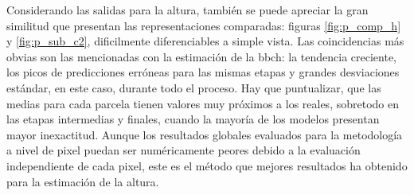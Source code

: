 \par Considerando las salidas para la altura, también se puede apreciar la gran similitud que presentan las representaciones comparadas: figuras \ref{fig:p_comp_h} y \ref{fig:p_sub_c2}, dificilmente diferenciables a simple vista. Las coincidencias más obvias son las mencionadas con la estimación de la \gls{bbch}: la tendencia creciente, los picos de predicciones erróneas para las mismas etapas y grandes desviaciones estándar, en este caso, durante todo el proceso. Hay que puntualizar, que las medias para cada parcela tienen valores muy próximos a los reales, sobretodo en las etapas intermedias y finales, cuando la mayoría de los modelos presentan mayor inexactitud. Aunque los resultados globales evaluados para la metodología a nivel de pixel puedan ser numéricamente peores debido a la evaluación independiente de cada pixel, este es el método que mejores resultados ha obtenido para la estimación de la altura.

